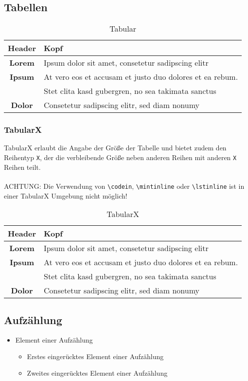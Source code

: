 \subsection{Tabellen}
\begin{table}[H]
	\center
	\begin{tabular}{| c | l |}
		\hline Header 	& Kopf\\ \hline\hline
		\textbf{Lorem} 	& Ipsum dolor sit amet, consetetur sadipscing elitr\\ \hline
		\textbf{Ipsum} 	& At vero eos et accusam et justo duo dolores et ea rebum.\\
						& Stet clita kasd gubergren, no sea takimata sanctus\\ \hline
		\textbf{Dolor} 	& Consetetur sadipscing elitr, sed diam nonumy\\\hline
	\end{tabular}
	\caption{Tabular}
	\label{tab:tabular}
\end{table}

\subsubsection{TabularX}
TabularX erlaubt die Angabe der Größe der Tabelle und bietet zudem den Reihentyp \texttt{X}, der die verbleibende Größe neben anderen Reihen mit anderen \texttt{X} Reihen teilt.
\\\\
ACHTUNG: Die Verwendung von \verb|\codein|, \verb|\mintinline| oder \verb|\lstinline| ist in einer TabularX Umgebung nicht möglich!
\begin{table}
    \center
    \begin{tabularx}{\textwidth}{| c | X |}
        \hline Header 	& Kopf\\ \hline\hline
        \textbf{Lorem} 	& Ipsum dolor sit amet, consetetur sadipscing elitr\\ \hline
        \textbf{Ipsum} 	& At vero eos et accusam et justo duo dolores et ea rebum.\\
            			& Stet clita kasd gubergren, no sea takimata sanctus\\ \hline
        \textbf{Dolor} 	& Consetetur sadipscing elitr, sed diam nonumy\\\hline
    \end{tabularx}
    \caption{TabularX}
    \label{tab:tabularx}
\end{table}

\newpage
\subsection{Aufzählung}
\begin{itemize}
	\item Element einer Aufzählung
	\begin{itemize}
        \item Erstes eingerücktes Element einer Aufzählung
        \item Zweites eingerücktes Element einer Aufzählung
    \end{itemize}
\end{itemize}

